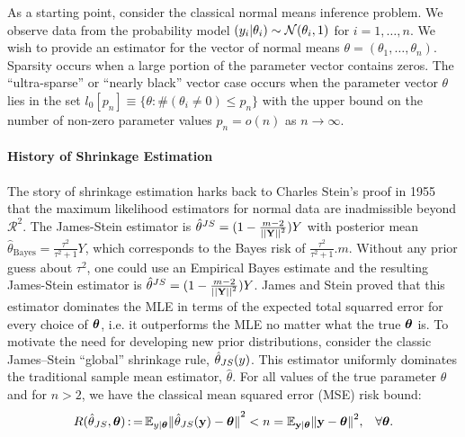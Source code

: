 \documentclass[11pt]{article}
\renewcommand{\E}{\mathbb E}
\numberwithin{equation}{section}
\begin{document}

As a starting point, consider the classical normal means inference problem. We observe data from the probability model $  (y_i | \theta_i)  \sim {\cal N} ( \theta_i,1)$ for $i = 1, \ldots, n$. We wish to provide an estimator for the vector of  normal means $ \theta = ( \theta_1, \ldots , \theta_n )$. Sparsity occurs when a large portion of the parameter vector contains zeros.  The ``ultra-sparse'' or ``nearly black'' vector case occurs when the parameter vector $\theta$ lies in the set $ l_0 [ p_n] \equiv \{ \theta : \# ( \theta_i \neq 0 ) \leq p_n \} $ with the upper bound on the number of non-zero parameter values $ p_n = o(n) $ as $ n \to \infty $.  

\paragraph{History of Shrinkage Estimation} 

The story of shrinkage estimation harks back to Charles Stein's proof in 1955 that the maximum likelihood estimators for normal data are inadmissible beyond $\mathcal{R}^2$. The James-Stein estimator is $\hat{\theta}^{JS} = (1 - \frac{m-2}{\left|\left|{\bf Y}\right|\right|^2})Y$ with posterior mean $\hat{\theta}_{\mathrm{Bayes}} = \frac{\tau^2}{\tau^2+1} Y$, which corresponds to the Bayes risk of $\frac{\tau^2}{\tau^2+1}.m$. Without any prior guess about $\tau^2$, one could use an Empirical Bayes estimate and the resulting James-Stein estimator is $\hat{\theta}^{JS} = (1 - \frac{m-2}{\left|\left|{\bf Y}\right|\right|^2})Y$. James and Stein proved that this estimator dominates the MLE in terms of the expected total squarred error for every choice of $\boldsymbol{\theta}$, i.e. it outperforms the MLE no matter what the true $\boldsymbol{\theta}$ is.
To motivate the need for developing new prior distributions, consider the classic James--Stein ``global'' shrinkage rule, ${\hat{\theta}}_{JS}{}(y)$. This estimator uniformly dominates the traditional sample mean estimator, $\hat{\theta}$. For all values of the true parameter $\theta$ and for $n>2$, we have the classical mean squared error (MSE) risk bound:
$$ 
R(\estJs, \btheta) \defeq \E_{y \mid \btheta} {\Vert \estJs(\y) - \btheta \Vert}^2 < n = \E_{\y \mid \btheta} {\Vert \y - \btheta \Vert}^2, \;\;\; \forall \btheta.
$$
\end{document}
